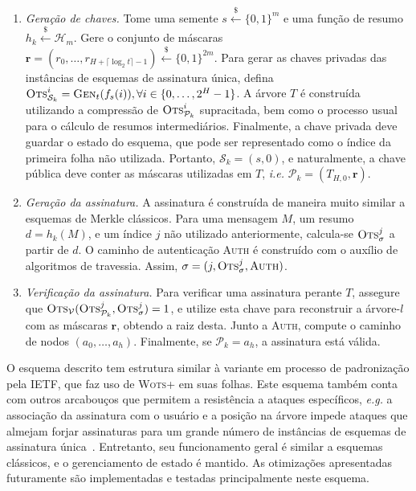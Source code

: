 \documentclass[12pt,notitlepage]{report}
\newcommand{\hh}{\mathcal{H}}
\newcommand{\pk}{\mathcal{P}_k}
\newcommand{\sk}{\mathcal{S}_k}
\newcommand{\binwds}[1]{\{0, 1\}^{#1}}
\newcommand{\wotsplus}{\textsc{Wots+}}
\begin{document}
\begin{enumerate}

  \item[] \emph{Geração de chaves.} Tome uma semente $s \stackrel{\$}{\longleftarrow} \binwds{m}$ e uma função de resumo $h_k \stackrel{\$}{\longleftarrow} \hh{}_m$. Gere o conjunto de máscaras $\mathbf{r} = (r_0, \dots, r_{H + \lceil \log_{2} t \rceil - 1}) \stackrel{\$}{\longleftarrow} \binwds{2m}$. Para gerar as chaves privadas das instâncias de esquemas de assinatura única, defina $\textsc{Ots}_{\sk{}}^{i} = \textsc{Gen}_t(f_s(i)), \forall i \in \{0, \dots, 2^H - 1\}$. A árvore $T$ é construída utilizando a compressão de $\textsc{Ots}_{\pk{}}^{i}$ supracitada, bem como o processo usual para o cálculo de resumos intermediários. Finalmente, a chave privada deve guardar o estado do esquema, que pode ser representado como o índice da primeira folha não utilizada. Portanto, $\sk{} = (s, 0)$, e naturalmente, a chave pública deve conter as máscaras utilizadas em $T$, \emph{i.e.} $\pk{} = (T_{H,0}, \mathbf{r})$.

  \item[] \emph{Geração da assinatura.} A assinatura é construída de maneira muito similar a esquemas de Merkle clássicos. Para uma mensagem $M$, um resumo $d = h_k(M)$, e um índice $j$
  não utilizado anteriormente, calcula-se $\textsc{Ots}_\sigma^{j}$ a partir de $d$. O caminho de autenticação \textsc{Auth} é construído com o auxílio de algoritmos de travessia. Assim, $\sigma = (j, \textsc{Ots}_\sigma^{j}, \textsc{Auth})$.

  \item[] \emph{Verificação da assinatura.} Para verificar uma assinatura perante $T$, assegure que $\textsc{Ots}_{\mathcal{V}}(\textsc{Ots}_{\pk{}}^{j}, \textsc{Ots}_{\sigma}^{j}) = 1$, e utilize esta chave para reconstruir a árvore-$l$ com as máscaras $\mathbf{r}$, obtendo a raiz desta. Junto a \textsc{Auth}, compute o caminho de nodos $(a_0, \dots, a_h)$. Finalmente, se $\pk{} = a_{h}$, a assinatura está válida.

\end{enumerate}

O esquema descrito tem estrutura similar à variante em processo de padronização pela IETF, que faz uso de \wotsplus{} em suas folhas. Este esquema também conta com outros arcabouços que permitem a resistência a ataques específicos, \emph{e.g.} a associação da assinatura com o usuário e a posição na árvore impede ataques que almejam forjar assinaturas para um grande número de instâncias de esquemas de assinatura única~\cite[9.1]{irtf-cfrg-xmss-hash-based-signatures-12}. Entretanto, seu funcionamento geral é similar a esquemas clássicos, e o gerenciamento de estado é mantido. As otimizações apresentadas futuramente são implementadas e testadas principalmente neste esquema.
\end{document}
